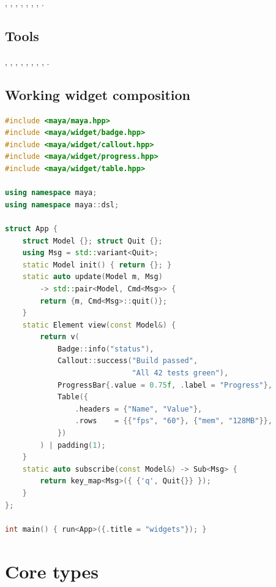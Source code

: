 , , ,
, , ,
, .

\subsection*{Tools}

, , ,
, , ,
, , .

\subsection*{Working widget composition}

\begin{lstlisting}[language=C++]
#include <maya/maya.hpp>
#include <maya/widget/badge.hpp>
#include <maya/widget/callout.hpp>
#include <maya/widget/progress.hpp>
#include <maya/widget/table.hpp>

using namespace maya;
using namespace maya::dsl;

struct App {
    struct Model {}; struct Quit {};
    using Msg = std::variant<Quit>;
    static Model init() { return {}; }
    static auto update(Model m, Msg)
        -> std::pair<Model, Cmd<Msg>> {
        return {m, Cmd<Msg>::quit()};
    }
    static Element view(const Model&) {
        return v(
            Badge::info("status"),
            Callout::success("Build passed",
                             "All 42 tests green"),
            ProgressBar{.value = 0.75f, .label = "Progress"},
            Table({
                .headers = {"Name", "Value"},
                .rows    = {{"fps", "60"}, {"mem", "128MB"}},
            })
        ) | padding(1);
    }
    static auto subscribe(const Model&) -> Sub<Msg> {
        return key_map<Msg>({ {'q', Quit{}} });
    }
};

int main() { run<App>({.title = "widgets"}); }
\end{lstlisting}

\section{Core types}

